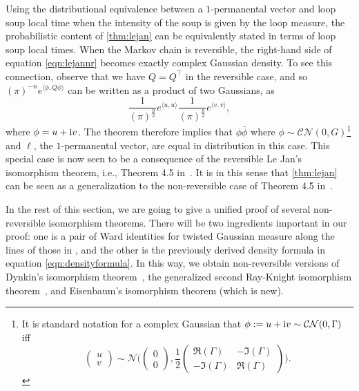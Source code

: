 \documentclass[a4paper, 11pt]{article}
\newcommand{\compi}{\textnormal{i}}
\begin{document}
Using the distributional equivalence between a $1$-permanental vector and loop soup local time when the intensity of the soup is given by the loop measure, the probabilistic content of \cref{thm:lejan} can be equivalently stated in terms of loop soup local times. When the Markov chain is reversible, the right-hand side of equation \eqref{eqn:lejannr} becomes exactly complex Gaussian density. To see this connection, observe that we have $Q = Q^\top$ in the reversible case, and so
\( (\pi)^{ - n} e^{\langle \phi, Q\bar{\phi}\rangle} \)
can be written as a product of two Gaussians, as
\[
\frac{1}{(\pi)^{\frac{n}{2}}} e^{\langle u, u \rangle}
\frac{1}{(\pi)^{\frac{n}{2}}} e^{\langle v, v \rangle},
\]
where $\phi = u + \compi v$. The theorem therefore implies that $\phi\bar{\phi}$ where $\phi\sim\mathcal{CN}(0,G)$\footnote{It is standard notation for a
complex Gaussian that $\phi:=u+\compi v\sim\mathcal{CN}(0,\Gamma)$ iff \[\begin{pmatrix}
u\\ v
\end{pmatrix}\sim\mathcal{N}\bigg(\begin{pmatrix}
0\\ 0
\end{pmatrix},\frac{1}{2}\begin{pmatrix}
    \Re(\Gamma) & -\Im(\Gamma) \\
-\Im(\Gamma) & \Re(\Gamma)
\end{pmatrix}\bigg).\]} and $\ell$, the $1$-permanental vector, are equal in distribution in this case. This special case is now seen to be a consequence of the reversible Le Jan's isomorphism theorem, i.e., Theorem 4.5 in~\cite{sznitman12}. It is in this sense that
\cref{thm:lejan} can be seen as a generalization
to the non-reversible case of Theorem 4.5 in~\cite{sznitman12}.


In the
rest of this section, we are going to give a unified proof of several non-reversible isomorphism theorems. There will be two ingredients important in our proof: one is a pair of Ward identities for twisted Gaussian measure along the lines of those in \cite{bhs21}, and the other is the previously derived density formula in equation \eqref{eqn:densityformula}. In this way, we obtain non-reversible versions of Dynkin's isomorphism theorem~\cite{eisenbaum13, lejan08}, the generalized second Ray-Knight isomorphism theorem~\cite{ek09}, and Eisenbaum's isomorphism theorem (which is new).
\end{document}
